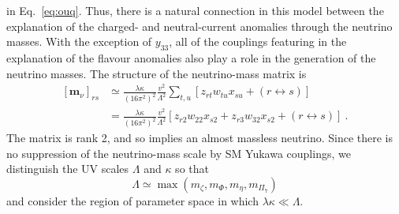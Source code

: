   in Eq.~\eqref{eq:ouq}. Thus, there is a natural connection in this model
  between the explanation of the charged- and neutral-current anomalies through
  the neutrino masses. With the exception of $y_{33}$, all of the couplings
  featuring in the explanation of the flavour anomalies also play a role in the
  generation of the neutrino masses. The structure of the neutrino-mass matrix
  is
  \begin{equation}
    \label{eq:flav-anom-mv}
    \begin{aligned}
      [\mathbf{m}_{\nu}]_{rs} &\simeq \frac{\lambda \kappa}{(16 \pi^{2})^{2}} \frac{v^{2}}{\Lambda^{2}} \sum_{t,u} [z_{rt} w_{tu} x_{su} + (r \leftrightarrow s)] \\
      &= \frac{\lambda \kappa}{(16 \pi^{2})^{2}} \frac{v^{2}}{\Lambda^{2}} [z_{r2} w_{22} x_{s2} + z_{r3}w_{32}x_{s2} + (r \leftrightarrow s)] \ .
    \end{aligned}
  \end{equation}
  The matrix is rank 2, and so implies an almost massless neutrino. Since there is no suppression of the neutrino-mass scale by SM Yukawa
  couplings, we distinguish the UV scales $\Lambda$ and $\kappa$ so that
  \begin{equation}
    \Lambda \simeq \max\left(m_{\zeta}, m_{\Phi}, m_{\eta}, m_{\Pi_{7}}\right)
  \end{equation}
  and consider the region of parameter space in which
  $\lambda \kappa \ll \Lambda$.


